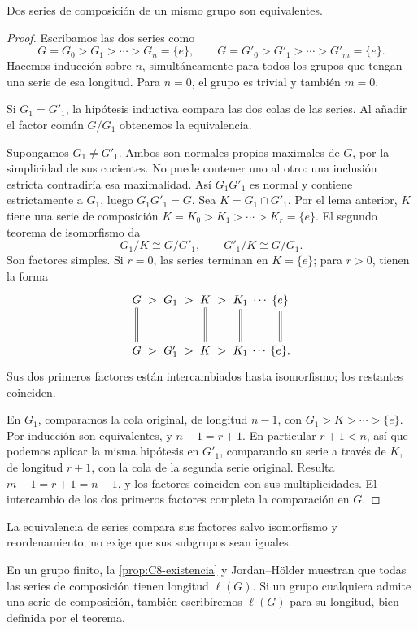 \begin{teo}\label{teo:C8-jh}
Dos series de composición de un mismo grupo son equivalentes.
\end{teo}
\begin{proof}
Escribamos las dos series como
\[
G=G_0>G_1>\cdots>G_n=\{e\},\qquad
G=G'_0>G'_1>\cdots>G'_m=\{e\}.
\]
Hacemos inducción sobre $n$, simultáneamente para todos los grupos que tengan una serie de esa longitud. Para $n=0$, el grupo es trivial y también $m=0$.

Si $G_1=G'_1$, la hipótesis inductiva compara las dos colas de las series. Al añadir el factor común $G/G_1$ obtenemos la equivalencia.

Supongamos $G_1\ne G'_1$. Ambos son normales propios maximales de $G$, por la simplicidad de sus cocientes. No puede contener uno al otro: una inclusión estricta contradiría esa maximalidad. Así $G_1G'_1$ es normal y contiene estrictamente a $G_1$, luego $G_1G'_1=G$. Sea $K=G_1\cap G'_1$. Por el lema anterior, $K$ tiene una serie de composición $K=K_0>K_1>\cdots>K_r=\{e\}$. El segundo teorema de isomorfismo da
\[
G_1/K\cong G/G'_1,\qquad G'_1/K\cong G/G_1.
\]
Son factores simples. Si $r=0$, las series terminan en $K=\{e\}$; para $r>0$, tienen la forma
\[
\begin{tikzcd}[column sep=1.1em,row sep=large]
G \arrow[r,phantom,"{>}" ] \arrow[d,equal] & G_1 \arrow[r,phantom,"{>}" ] & K \arrow[r,phantom,"{>}" ] \arrow[d,equal] & K_1 \arrow[r,phantom,"\cdots" ] \arrow[d,equal] & \{e\} \arrow[d,equal] \\
G \arrow[r,phantom,"{>}" ] & G'_1 \arrow[r,phantom,"{>}" ] & K \arrow[r,phantom,"{>}" ] & K_1 \arrow[r,phantom,"\cdots" ] & \{e\}.
\end{tikzcd}
\]
Sus dos primeros factores están intercambiados hasta isomorfismo; los restantes coinciden.

En $G_1$, comparamos la cola original, de longitud $n-1$, con $G_1>K>\cdots>\{e\}$. Por inducción son equivalentes, y $n-1=r+1$. En particular $r+1<n$, así que podemos aplicar la misma hipótesis en $G'_1$, comparando su serie a través de $K$, de longitud $r+1$, con la cola de la segunda serie original. Resulta $m-1=r+1=n-1$, y los factores coinciden con sus multiplicidades. El intercambio de los dos primeros factores completa la comparación en $G$.
\end{proof}
\begin{obs}
La equivalencia de series compara sus factores salvo isomorfismo y reordenamiento; no exige que sus subgrupos sean iguales.
\end{obs}
En un grupo finito, la \cref{prop:C8-existencia} y Jordan--Hölder muestran que todas las series de composición tienen longitud $\ell(G)$. Si un grupo cualquiera admite una serie de composición, también escribiremos $\ell(G)$ para su longitud, bien definida por el teorema.

